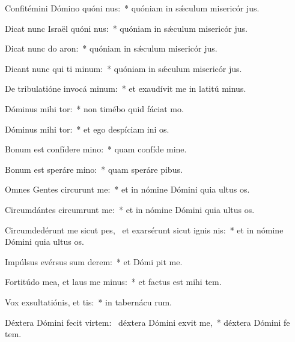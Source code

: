 \item Confitémini Dómino quóni nus:~* quóniam in sǽculum misericór jus.
\item Dicat nunc Israël quóni nus:~* quóniam in sǽculum misericór jus.
\item Dicat nunc do aron:~* quóniam in sǽculum misericór jus.
\item Dicant nunc qui ti minum:~* quóniam in sǽculum misericór jus.
\item De tribulatióne invocá minum:~* et exaudívit me in latitú minus.
\item Dóminus mihi tor:~* non timébo quid fáciat  mo.
\item Dóminus mihi tor:~* et ego despíciam ini os.
\item Bonum est confídere  mino:~* quam confíde  mine.
\item Bonum est speráre  mino:~* quam speráre  pibus.
\item Omnes Gentes circurunt me:~* et in nómine Dómini quia ultus   os.
\item Circumdántes circumrunt me:~* et in nómine Dómini quia ultus   os.
\item Circumdedérunt me sicut pes,~\pscross{} et exarsérunt sicut ignis  nis:~* et in nómine Dómini quia ultus   os.
\item Impúlsus evérsus sum  derem:~* et Dómi pit me.
\item Fortitúdo mea, et laus me minus:~* et factus est mihi  tem.
\item Vox exsultatiónis, et tis:~* in tabernácu rum.
\item Déxtera Dómini fecit virtem:~\pscross{} déxtera Dómini exvit me,~* déxtera Dómini fe tem.
